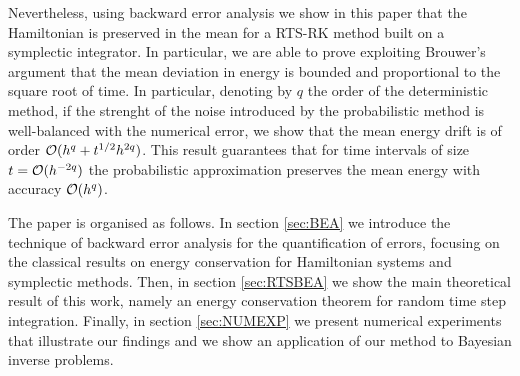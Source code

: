 \documentclass[10pt]{article}
\begin{document}
Nevertheless, using backward error analysis we show in this paper that the Hamiltonian is preserved in the mean for a RTS-RK method built on a symplectic integrator. In particular, we are able to prove exploiting Brouwer's argument \cite{Bro37} that the mean deviation in energy is bounded and proportional to the square root of time. In particular, denoting by $q$ the order of the deterministic method, if the strenght of the noise introduced by the probabilistic method is well-balanced with the numerical error, we show that the mean energy drift is of order $\mathcal{O}(h^q + t^{1/2}h^{2q})$. This result guarantees that for time intervals of size $t = \mathcal{O}(h^{-2q})$ the probabilistic approximation preserves the mean energy with accuracy $\mathcal{O}(h^q)$.

The paper is organised as follows. In section \ref{sec:BEA} we introduce the technique of backward error analysis for the quantification of errors, focusing on the classical results on energy conservation for Hamiltonian systems and symplectic methods. Then, in section \ref{sec:RTSBEA} we show the main theoretical result of this work, namely an energy conservation theorem for random time step integration. Finally, in section \ref{sec:NUMEXP} we present numerical experiments that illustrate our findings and we show an application of our method to Bayesian inverse problems.
\end{document}
